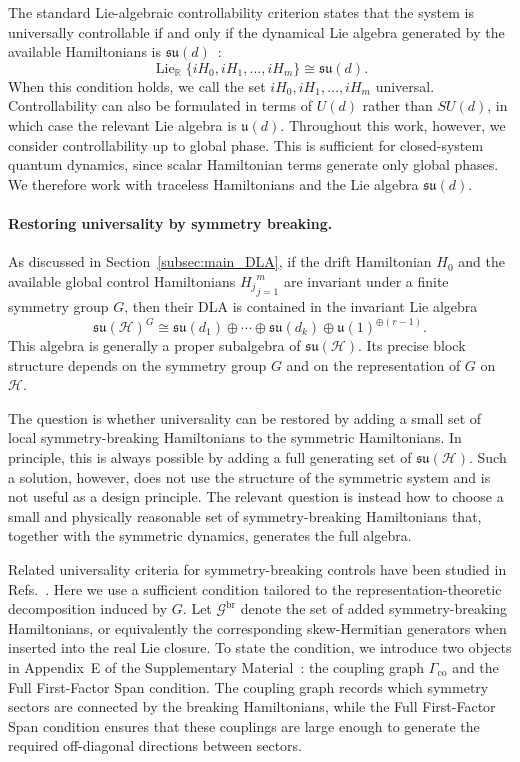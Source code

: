 \documentclass[10pt,twocolumn,superscriptaddress,aps,amsmath,amssymb,citeautoscript,floatfix,prx,longbibliography]{revtex4-2}
\newcounter{alg}
\theoremstyle{plain}
\theoremstyle{plain}
\theoremstyle{plain}
\theoremstyle{plain}
\theoremstyle{plain}
\theoremstyle{plain}
\begin{document}
The standard Lie-algebraic controllability criterion states that the system is universally controllable if and only if the dynamical Lie algebra generated by the available Hamiltonians is $\mathfrak{su}(d)$~\cite{Albertini2003}:
$$
\operatorname{Lie}_{\mathbb R}
\{iH_0,iH_1,\ldots,iH_m\}
\cong
\mathfrak{su}(d).
$$
When this condition holds, we call the set ${iH_0,iH_1,\ldots,iH_m}$ universal. Controllability can also be formulated in terms of $U(d)$ rather than $SU(d)$, in which case the relevant Lie algebra is $\mathfrak{u}(d)$. Throughout this work, however, we consider controllability up to global phase. This is sufficient for closed-system quantum dynamics, since scalar Hamiltonian terms generate only global phases. We therefore work with traceless Hamiltonians and the Lie algebra $\mathfrak{su}(d)$.

\paragraph{Restoring universality by symmetry breaking.}

As discussed in Section~\ref{subsec:main_DLA}, if the drift Hamiltonian $H_0$ and the available global control Hamiltonians ${H_j}_{j=1}^m$ are invariant under a finite symmetry group $G$, then their DLA is contained in the invariant Lie algebra
$$
\mathfrak{su}(\mathcal H)^G
\cong
\mathfrak{su}(d_1)
\oplus
\cdots
\oplus
\mathfrak{su}(d_k)
\oplus
\mathfrak{u}(1)^{\oplus(r-1)}.
$$
This algebra is generally a proper subalgebra of $\mathfrak{su}(\mathcal H)$. Its precise block structure depends on the symmetry group $G$ and on the representation of $G$ on $\mathcal H$.

The question is whether universality can be restored by adding a small set of local symmetry-breaking Hamiltonians to the symmetric Hamiltonians. In principle, this is always possible by adding a full generating set of $\mathfrak{su}(\mathcal H)$. Such a solution, however, does not use the structure of the symmetric system and is not useful as a design principle. The relevant question is instead how to choose a small and physically reasonable set of symmetry-breaking Hamiltonians that, together with the symmetric dynamics, generates the full algebra.

Related universality criteria for symmetry-breaking controls have been studied in Refs.~\cite{Hu2025, AlbertiniDAlessandro2025}. Here we use a sufficient condition tailored to the representation-theoretic decomposition induced by $G$. Let $\mathcal G^{\mathrm{br}}$ denote the set of added symmetry-breaking Hamiltonians, or equivalently the corresponding skew-Hermitian generators when inserted into the real Lie closure. To state the condition, we introduce two objects in Appendix~E of the Supplementary Material~\cite{SuppMat}: the coupling graph $\Gamma_{\mathrm{co}}$ and the Full First-Factor Span condition. The coupling graph records which symmetry sectors are connected by the breaking Hamiltonians, while the Full First-Factor Span condition ensures that these couplings are large enough to generate the required off-diagonal directions between sectors.
\end{document}
